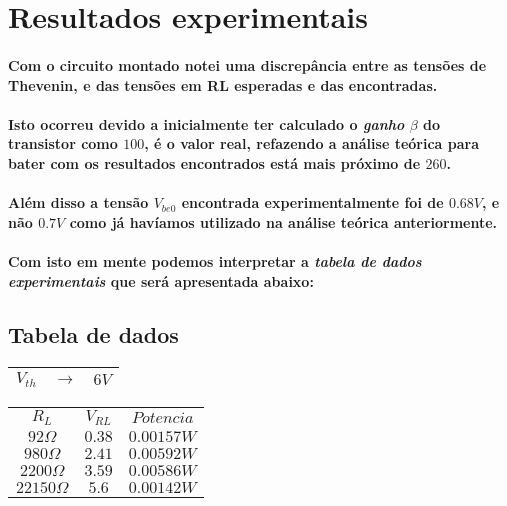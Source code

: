 \documentclass[12pt,twoside, a4paper, twocolumn]{article}
\begin{document}
\section{Resultados experimentais}

\paragraph*{Com o circuito montado notei uma discrepância entre as tensões de Thevenin, e das tensões em RL esperadas e das encontradas.}

\paragraph*{Isto ocorreu devido a inicialmente ter calculado o \emph{ganho} $\beta$ do transistor como $100$, é o valor real, refazendo a análise teórica para bater com os resultados encontrados está mais próximo de $260$.}

\paragraph*{Além disso a tensão $V_{be0}$ encontrada experimentalmente foi de $0.68V$, e não $0.7V$ como já havíamos utilizado na análise teórica anteriormente.}

\paragraph*{Com isto em mente podemos interpretar a \emph{tabela de dados experimentais} que será apresentada abaixo:}

\subsection{Tabela de dados}

\begin{center}
    \begin{tabular}{ |ccc| }
        \hline
        $V_{th}$ & $\rightarrow$ & $6V$ \\
        \hline
    \end{tabular}
\end{center}

\begin{center}
    \begin{tabular}{ |c|c|c| }
        \hline
        $R_L$            & $V_{RL}$ & $Potencia$ \\
        $92\varOmega$    & $0.38$   & $0.00157W$ \\
        $980\varOmega$   & $2.41$   & $0.00592W$ \\
        $2200\varOmega$  & $3.59$   & $0.00586W$ \\
        $22150\varOmega$ & $5.6$    & $0.00142W$ \\
        \hline
    \end{tabular}
\end{center}
\end{document}
